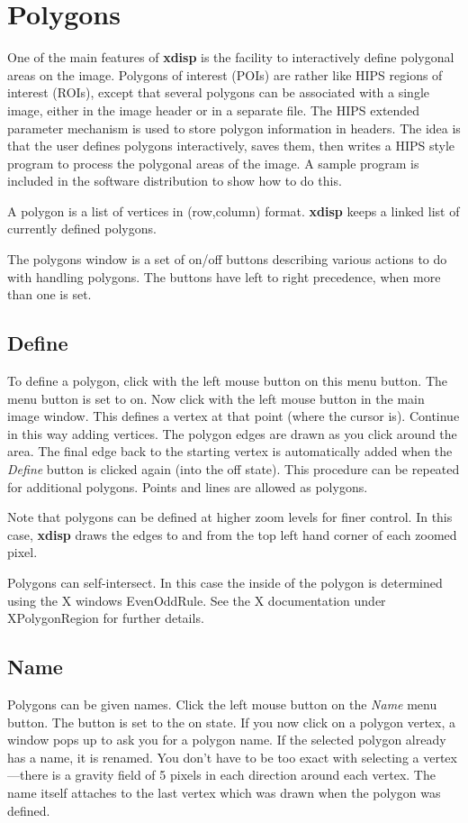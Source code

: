 \section{Polygons}
One of the main features of {\bf xdisp} is the facility  to interactively define polygonal areas on the image. Polygons of interest (POIs) are rather like HIPS regions of interest (ROIs), except that several polygons can be associated with a single image, either in the image header or in a separate file. The HIPS extended parameter mechanism is used to store polygon information in headers. The idea is that the user defines polygons interactively, saves them, then writes a HIPS style program to process the polygonal areas of the image. A sample program is included in the software distribution to show how to do this.

A polygon is a list of vertices in (row,column) format. {\bf xdisp} keeps a linked list of currently defined polygons.

The polygons window is a set of on/off buttons describing various actions to do with handling polygons. The buttons have left to right precedence, when more than one is set.

\subsection{Define}
To define a polygon, click with the left mouse button on this menu button. The menu button is set to on. Now click with the left mouse button in the main image window. This defines a vertex at that point (where the cursor is). Continue in this way adding vertices. The polygon edges are drawn as you click around the area. The final edge back to the starting vertex is automatically added when the {\it Define\/} button is clicked again (into the off state). This procedure can be repeated for additional polygons. Points and lines are allowed as polygons. 

Note that polygons can be defined at higher zoom levels for finer control. In this case, {\bf xdisp} draws the edges to and from the top left hand corner of each zoomed pixel.

Polygons can self-intersect. In this case the inside of the polygon is determined using the X windows EvenOddRule. See the X documentation under XPolygonRegion for further details.

\subsection{Name}
Polygons can be given names. Click the left mouse button on the {\it Name\/} menu button. The button is set to the on state. If you now click on a polygon vertex, a window pops up to ask you for a polygon name. If the selected polygon already has a name, it is renamed. You don't have to be too exact with selecting a vertex---there is a gravity field of 5 pixels in each direction around each vertex. The name itself attaches to the last vertex which was drawn when the polygon was defined. 

